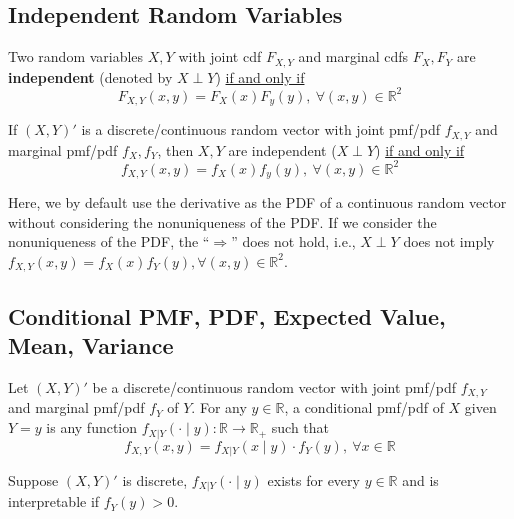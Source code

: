 \documentclass[11pt]{elegantbook}
\begin{document}
\subsection{Independent Random Variables}
\begin{definition}
    \normalfont
    Two random variables $X, Y$ with joint cdf $F_{X,Y}$ and marginal cdfs $F_X, F_Y$ are \textbf{independent} (denoted by $X\perp Y$) \underline{if and only if} $$F_{X,Y}(x,y)=F_X(x)F_y(y),\ \forall (x,y)\in \mathbb{R}^2$$
\end{definition}

\begin{proposition}
    If $(X,Y)'$ is a discrete/continuous random vector with joint pmf/pdf $f_{X,Y}$ and marginal pmf/pdf $f_X, f_Y$, then $X,Y$ are independent ($X\perp Y$) \underline{if and only if}
    $$f_{X,Y}(x,y)=f_X(x)f_y(y),\ \forall (x,y)\in \mathbb{R}^2$$
\end{proposition}
\begin{note}
    Here, we by default use the derivative as the PDF of a continuous random vector without considering the nonuniqueness of the PDF. If we consider the nonuniqueness of the PDF, the ``$\Rightarrow$'' does not hold, i.e., \(X \perp Y\) does not imply $f_{X,Y}(x,y) = f_X(x)f_Y(y), \forall (x,y) \in \mathbb{R}^2$.
\end{note}


\subsection{Conditional PMF, PDF, Expected Value, Mean, Variance}
\begin{definition}
    \normalfont
    Let $(X,Y)'$ be a discrete/continuous random vector with joint pmf/pdf $f_{X,Y}$ and marginal pmf/pdf $f_Y$ of $Y$. For any $y\in \mathbb{R}$, a conditional pmf/pdf of $X$ given $Y=y$ is any function $f_{X|Y}(\cdot\mid y): \mathbb{R} \rightarrow \mathbb{R}_+$ such that $$f_{X,Y}(x,y)=f_{X|Y}(x\mid y)\cdot f_Y(y),\ \forall x\in \mathbb{R}$$
\end{definition}

\begin{proposition}
    Suppose $(X,Y)'$ is discrete, $f_{X|Y}(\cdot\mid y)$ exists for every $y\in \mathbb{R}$ and is interpretable if $f_Y(y)>0$.
\end{proposition}
\end{document}
